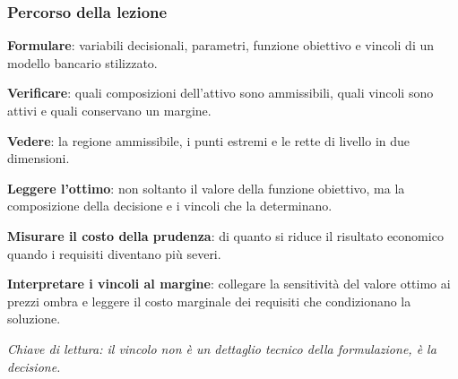 %

\begin{frame}%
%

\frametitle{Percorso della lezione}%
%

%


\begin{stepenumerate}
\item[1.] \textbf{Formulare}: variabili decisionali, parametri, funzione
obiettivo e vincoli di un modello bancario stilizzato.

\item[2.] \textbf{Verificare}: quali composizioni dell'attivo sono
ammissibili, quali vincoli sono attivi e quali conservano un margine.

\item[3.] \textbf{Vedere}: la regione ammissibile, i punti estremi e le rette
di livello in due dimensioni.

\item[4.] \textbf{Leggere l'ottimo}: non soltanto il valore della funzione
obiettivo, ma la composizione della decisione e i vincoli che la determinano.

\item[5.] \textbf{Misurare il costo della prudenza}: di quanto si riduce il
risultato economico quando i requisiti diventano pi\`{u} severi.

\item[6.] \textbf{Interpretare i vincoli al margine}: collegare la
sensitivit\`{a} del valore ottimo ai prezzi ombra e leggere il costo marginale
dei requisiti che condizionano la soluzione.
\end{stepenumerate}

\medskip

\begin{center}
{\small \emph{Chiave di lettura: il vincolo non \`{e} un dettaglio tecnico
della formulazione, \`{e} la decisione.}}
\end{center}

%

\transboxout
\end{frame}%


